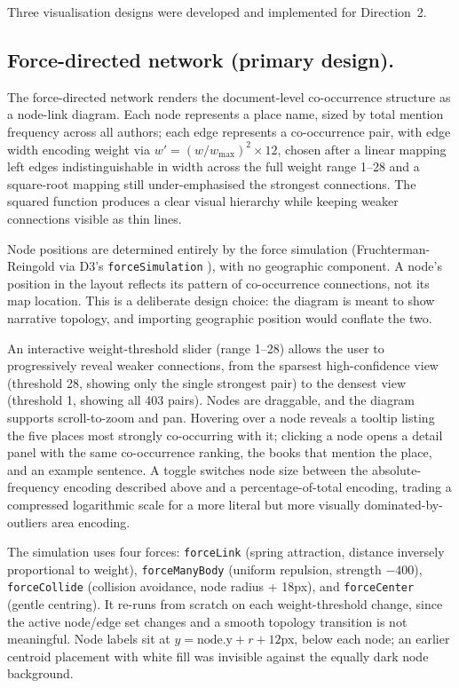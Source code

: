 \documentclass[logo,msc]{infthesis}
\begin{document}
Three visualisation designs were developed and implemented for Direction~2.
 
\subsection{Force-directed network (primary design).} The force-directed network renders the document-level co-occurrence structure as a node-link diagram. Each node represents a place name, sized by total mention frequency across all authors; each edge represents a co-occurrence pair, with edge width encoding weight via $w' = (w / w_{\max})^2 \times 12$, chosen after a linear mapping left edges indistinguishable in width across the full weight range 1--28 and a square-root mapping still under-emphasised the strongest connections. The squared function produces a clear visual hierarchy while keeping weaker connections visible as thin lines.
 
Node positions are determined entirely by the force simulation (Fruchterman-Reingold \cite{fruchterman1991} via D3's \texttt{forceSimulation} \cite{bostock2011}), with no geographic component. A node's position in the layout reflects its pattern of co-occurrence connections, not its map location. This is a deliberate design choice: the diagram is meant to show narrative topology, and importing geographic position would conflate the two.
 
An interactive weight-threshold slider (range 1--28) allows the user to progressively reveal weaker connections, from the sparsest high-confidence view (threshold 28, showing only the single strongest pair) to the densest view (threshold 1, showing all 403 pairs). Nodes are draggable, and the diagram supports scroll-to-zoom and pan. Hovering over a node reveals a tooltip listing the five places most strongly co-occurring with it; clicking a node opens a detail panel with the same co-occurrence ranking, the books that mention the place, and an example sentence. A toggle switches node size between the absolute-frequency encoding described above and a percentage-of-total encoding, trading a compressed logarithmic scale for a more literal but more visually dominated-by-outliers area encoding.

The simulation uses four forces: \texttt{forceLink} (spring attraction, distance inversely proportional to weight), \texttt{forceManyBody} (uniform repulsion, strength $-400$), \texttt{forceCollide} (collision avoidance, node radius + 18px), and \texttt{forceCenter} (gentle centring). It re-runs from scratch on each weight-threshold change, since the active node/edge set changes and a smooth topology transition is not meaningful. Node labels sit at $y = \text{node.y} + r + 12$px, below each node; an earlier centroid placement with white fill was invisible against the equally dark node background.
\end{document}
